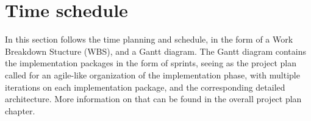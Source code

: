 \section{Time schedule}
In this section follows the time planning and schedule, in the form of a Work Breakdown Stucture (WBS), and a Gantt diagram.
The Gantt diagram contains the implementation packages in the form of sprints, seeing as the project plan called for an agile-like organization of the implementation phase, with multiple iterations on each implementation package, and the corresponding detailed architecture. More information on that can be found in the overall project plan chapter.
 